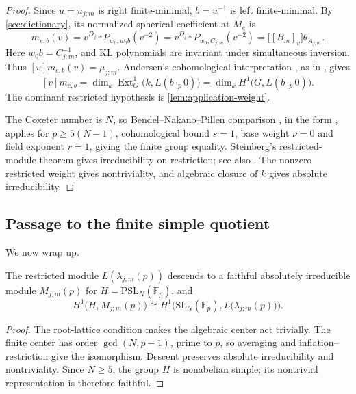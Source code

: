 \documentclass[a4paper,11pt]{amsart}
\numberwithin{equation}{subsection}
\theoremstyle{plain}
\theoremstyle{definition}
\theoremstyle{remark}
\begin{document}
\begin{proof}
Since $u=u_{j;m}$ is right finite-minimal, $b=u^{-1}$ is left
finite-minimal. By \autoref{sec:dictionary}, its normalized spherical
coefficient at $M_e$ is
\[
m_{e,b}(v)=v^{D_{j;m}}P_{w_0,w_0b}(v^{-2})
=v^{D_{j;m}}P_{w_0,C_{j;m}}(v^{-2})
=\big[[B_m]_v\big]\theta_{A_{j;m}}.
\]
Here $w_0b=C_{j;m}^{-1}$, and KL polynomials are invariant under
simultaneous inversion. Thus $[v]m_{e,b}(v)=\mu_{j;m}$.
Andersen's cohomological interpretation \cite{Andersen}, as in
\cite[Theorem~4.5]{Luebeck}, gives
\[
[v]m_{e,b}=\dim_k\operatorname{Ext}^1_{G}\big(k,L(b\cdot_p0)\big)
=\dim_k H^1\big(G,L(b\cdot_p0)\big).
\]
The dominant restricted hypothesis is \autoref{lem:application-weight}.

The Coxeter number is $N$, so Bendel--Nakano--Pillen comparison
\cite[Theorem~7.5]{BNP}, in the form \cite[Theorem~4.6]{Luebeck},
applies for $p\ge5(N-1)$, cohomological bound $s=1$, base weight
$\nu=0$ and field exponent $r=1$, giving the finite group equality.
Steinberg's restricted-module theorem
\cite[Theorems~1.3, 6.1 and 7.4]{Steinberg} gives irreducibility on
restriction; see also \cite[Proposition~5.3]{Luebeck}.
The nonzero restricted weight gives nontriviality, and algebraic
closure of $k$ gives absolute irreducibility.
\end{proof}

\subsection{Passage to the finite simple quotient}

We now wrap up.

\begin{lemma}\label{lem:simple-quotient}
The restricted module $L(\lambda_{j;m}(p))$ descends to a faithful
absolutely irreducible module $M_{j;m}(p)$ for
$H=\mathrm{PSL}_N(\mathbb F_p)$, and
\[
H^1\big(H,M_{j;m}(p)\big)
\cong H^1\Big(\mathrm{SL}_N(\mathbb F_p),L\big(\lambda_{j;m}(p)\big)\Big).
\]
\end{lemma}

\begin{proof}
The root-lattice condition makes the algebraic center act
trivially. The finite center has order $\gcd(N,p-1)$, prime to $p$,
so averaging and inflation--restriction give the isomorphism.
Descent preserves absolute irreducibility and nontriviality.
Since $N\ge5$, the group $H$ is nonabelian simple; its nontrivial
representation is therefore faithful.
\end{proof}
\end{document}
